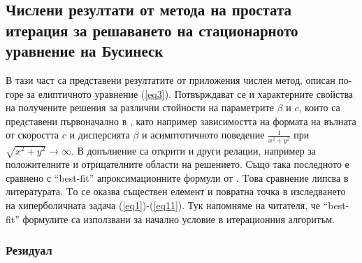 \documentclass[a4paper]{article}
\newcommand{\rf}[1]{(\ref{#1})}
\theoremstyle{remark}
\begin{document}
\begin{large}
\subsection{Числени резултати от метода на простата итерация за решаването на стационарното уравнение на Бусинеск}\label{resultsElliptic}
В тази част са представени резултатите от приложения числен метод, описан по-горе за елиптичното уравнение \rf{eq3}. Потвърждават се и характерните свойства на получените решения за различни стойности на параметрите $\beta$ и $c$, които са представени първоначално в \cite{ref117,ref116}, като например зависимостта на формата на вълната от скоростта $c$ и дисперсията $\beta$ и асимптотичното поведение $\frac{1}{x^2 + y^2}$ при $\sqrt{x^2 + y^2} \rightarrow \infty$. В допълнение са открити и други релации, например за положителните и отрицателните области на решението.
Също така последното е сравнено с ``best-fit'' апроксимационните формули от \cite{ref15}. Tова сравнение липсва в литературата. Tо се оказва съществен елемент и повратна точка в изследването на хиперболичната задача \rf{eq1}-\rf{eq11}. Тук напомняме на читателя, че ``best-fit'' формулите са използвани за начално условие в итерационния алгоритъм.

\subsubsection{Резидуал}


\end{large}
\end{document}
